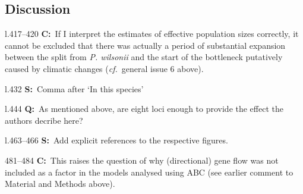 \documentclass[11pt]{article}
\newenvironment{my_description}
{\begin{description}
  \setlength{\itemsep}{2pt}
  \setlength{\parskip}{0pt}
  \setlength{\parsep}{0pt}}
{\end{description}}
\newcommand{\C}{\textbf{C:}\ }
\newcommand{\Q}{\textbf{Q:}\ }
\newcommand{\V}{\textbf{S:}\ }
\begin{document}
\subsection{Discussion}

\begin{my_description}
	\item[l.417--420] \C If I interpret the estimates of effective population sizes correctly, it cannot be excluded that there was actually a period of substantial expansion between the split from \emph{P. wilsonii} and the start of the bottleneck putatively caused by climatic changes (\emph{cf.}\ general issue 6 above).
	\item[l.432] \V Comma after `In this species'
	\item[l.444] \Q As mentioned above, are eight loci enough to provide the effect the authors decribe here?
	\item[l.463--466] \V Add explicit references to the respective figures.
	\item[481--484] \C This raises the question of why (directional) gene flow was not included as a factor in the models analysed using ABC (see earlier comment to Material and Methods above).
\end{my_description}
	
\end{document}
